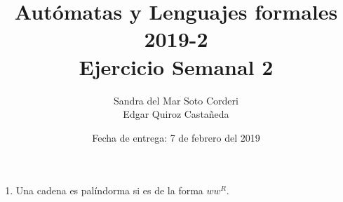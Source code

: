 \documentclass{article}
\begin{document}
    
    \title{Autómatas y Lenguajes formales 2019-2\\
    \large Ejercicio Semanal 2}

    \date{Fecha de entrega: 7 de febrero del 2019}

    \author{Sandra del Mar Soto Corderi\\
    Edgar Quiroz Castañeda}

    \maketitle


    \begin{enumerate}
        \item {

            Una cadena es palíndorma si es de la forma $ww^R$.
            
}
\end{enumerate}
\end{document}
